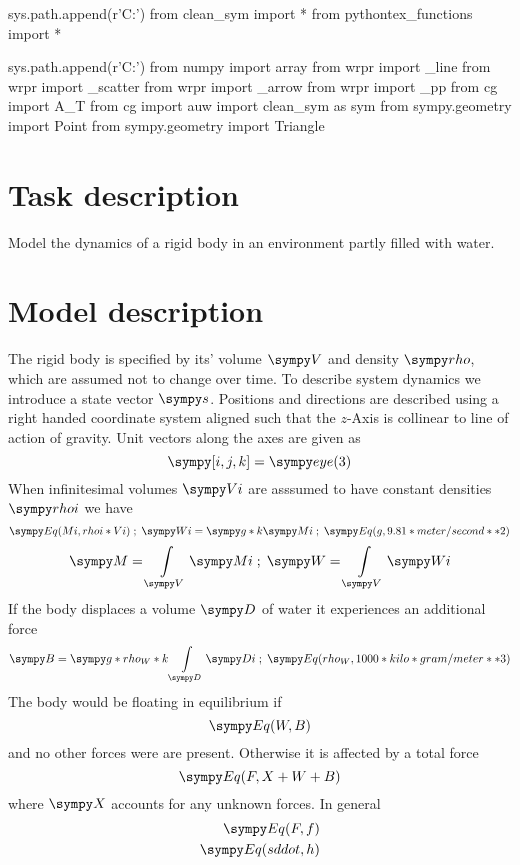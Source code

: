 
\tableofcontents

\begin{sympycode}
sys.path.append(r'C:\Users\Murad\evrythg')
from clean_sym import *
from pythontex_functions import *
\end{sympycode}

\begin{pylabcode}
sys.path.append(r'C:\Users\Murad\evrythg')
from numpy import array
from wrpr import _line
from wrpr import _scatter
from wrpr import _arrow
from wrpr import _pp
from cg import A_T
from cg import  auw
import clean_sym as sym
from sympy.geometry import Point
from sympy.geometry import Triangle
\end{pylabcode}


\section{Task description}
Model the dynamics of a rigid body in an environment partly filled with water.
\section{Model description}
The rigid body is specified by its' volume $\s{V}$ and density $\s{rho}$, which are assumed not to change over time.  To describe system dynamics we introduce a state vector $\s{s}$.  Positions and directions are described using a right handed coordinate system aligned such that the $z$-Axis is collinear to line of action of gravity.  Unit vectors along the axes are given as
$$\s{[i, j, k]} = \s{eye(3)}$$
When infinitesimal volumes $\s{Vi}$ are asssumed to have constant densities $\s{rhoi}$ we have 
$$\s{Eq(Mi, rhoi * Vi)} \;;\; \s{Wi} =  \s{g * k} \s{Mi} \;;\; \s{Eq(g, 9.81 * meter/second**2)}$$
$$\s{M} = \int\limits_{\s{V}} \s{Mi} \;;\; \s{W} = \int\limits_{\s{V}} \s{Wi}$$ 
If the body displaces a volume $\s{D}$ of water it experiences an additional force
$$\s{B} = \s{g * rho_W *  k}\int\limits_{\s{D}} \s{Di} \;;\; \s{Eq(rho_W, 1000 * kilo * gram/meter**3)}$$
The body would be floating in equilibrium if
$$\s{Eq(W, B)}$$ and no other forces were are present.  
Otherwise it is affected by a total force
$$\s{Eq(F, X + W + B)}$$
where $\s{X}$ accounts for any unknown forces.
In general
\begin{equation}
	\begin{split}
		\s{Eq(F, f)} \\
		\s{Eq(sddot, h)} \\
\end{split}
	\label{eq:eom}
\end{equation}

